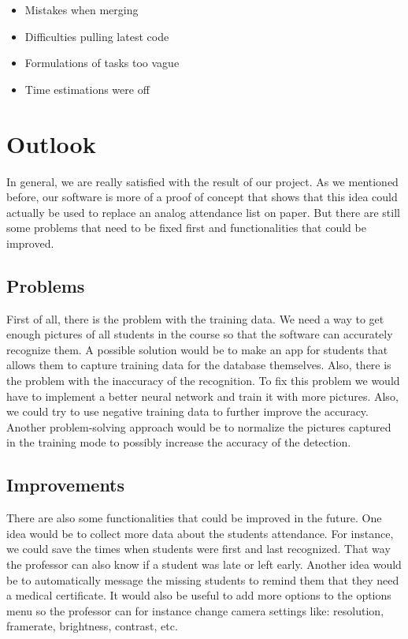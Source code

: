 \documentclass[12pt, a4paper]{article}
\begin{document}
\begin{itemize}
\item  Mistakes when merging
\item  Difficulties pulling latest code
\item  Formulations of tasks too vague
\item  Time estimations were off
\end{itemize}



\newpage




\section{Outlook}
In general, we are really satisfied with the result of our project. As we mentioned before, our software is more of a proof of concept that shows that this idea could actually be used to replace an analog attendance list on paper. But there are still some problems that need to be fixed first and functionalities that could be improved. 

\subsection{Problems}
First of all, there is the problem with the training data. We need a way to get enough pictures of all students in the course so that the software can accurately recognize them. A possible solution would be to make an app for students that allows them to capture training data for the database themselves. Also, there is the problem with the inaccuracy of the recognition. To fix this problem we would have to implement a better neural network and train it with more pictures. Also, we could  try to use negative training data to further improve the accuracy. Another problem-solving approach would be to normalize the pictures captured in the training mode to possibly increase the accuracy of the detection. 

\subsection{Improvements}
There are also some functionalities that could be improved in the future. One idea would be to collect more data about the students attendance. For instance, we could save the times when students were first and last recognized. That way the professor can also know if a student was late or left early. Another idea would be to automatically message the missing students to remind them that they need a medical certificate. It would also be useful to add more options to the options menu so the professor can for instance change camera settings like: resolution, framerate, brightness, contrast, etc. 
\newpage

\end{document}
